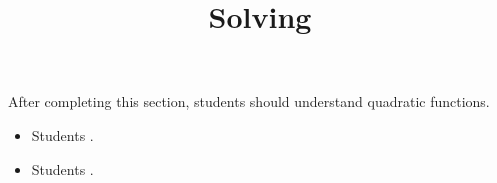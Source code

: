 \documentclass{ximera}
\title{Solving}
\begin{document}
\begin{abstract}
\end{abstract}

\maketitle

\begin{sectionOutcomes}

After completing this section, students should understand quadratic functions. 

\begin{itemize}
\item Students .
\item Students .
\end{itemize}

\end{sectionOutcomes}
\end{document}
